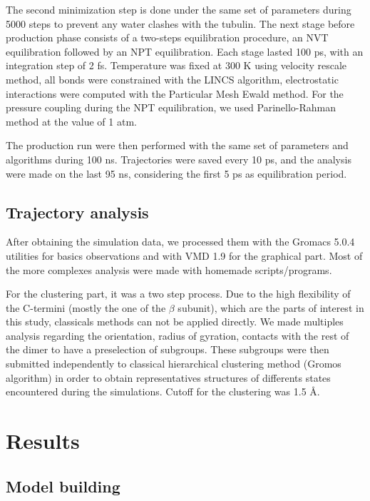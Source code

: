 \documentclass[a4paper]{article}
\begin{document}
The second minimization step is done under the same set of parameters during 5000 steps to prevent any water
clashes with the tubulin. The next stage before production phase consists of a two-steps equilibration procedure,
an NVT equilibration followed by an NPT equilibration. Each stage lasted 100 ps, with an integration step of 2 fs.
Temperature was fixed at 300 K using velocity rescale method, all bonds were constrained with the LINCS algorithm,
electrostatic interactions were computed with the Particular Mesh Ewald method. For the pressure coupling during
the NPT equilibration, we used Parinello-Rahman method at the value of 1 atm.

The production run were then performed with the same set of parameters and algorithms during 100 ns. Trajectories
were saved every 10 ps, and the analysis were made on the last 95 ns, considering the first 5 ps as equilibration
period.


\subsection{Trajectory analysis}

After obtaining the simulation data, we processed them with the Gromacs 5.0.4 utilities for basics observations and
with VMD 1.9 for the graphical part. Most of the more complexes analysis were made with homemade scripts/programs.

For the clustering part, it was a two step process. Due to the high flexibility of the C-termini (mostly the one of
the $\beta$ subunit), which are the parts of interest in this study, classicals methods can not be applied directly.
We made multiples analysis regarding the orientation, radius of gyration, contacts with the rest of the dimer to have
a preselection of subgroups. These subgroups were then submitted independently to classical hierarchical clustering
method (Gromos algorithm) in order to obtain representatives structures of differents states encountered during the
simulations. Cutoff for the clustering was 1.5 {\AA}.


\section{Results}

\subsection{Model building}
\end{document}
